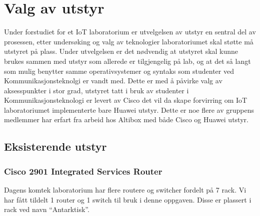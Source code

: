 \documentclass{article}
\begin{document}

\newpage
\section{Valg av utstyr}
Under forstudiet for et IoT laboratorium er utvelgelsen av utstyr en sentral del av prosessen, etter undersøking og valg av teknologier laboratoriumet skal støtte må utstyret på plass. Under utvelgelsen er det nødvendig at utstyret skal kunne brukes sammen med utstyr som allerede er tilgjengelig på lab, og at det så langt som mulig benytter samme operativsystemer og syntaks som studenter ved Kommunikasjonsteknolgi er vandt med. Dette er med å påvirke valg av aksesspunkter i stor grad, utstyret tatt i bruk av studenter i Kommunikasjonsteknologi er levert av Cisco det vil da skape forvirring om IoT laboratoriumet implementerte bare Huawei utstyr. Dette er noe flere av gruppens medlemmer har erfart fra arbeid hos Altibox med både Cisco og Huawei utstyr.

\subsection{Eksisterende utstyr}

\subsubsection{Cisco 2901 Integrated Services Router}
Dagens komtek laboratorium har flere routere og switcher fordelt på 7 rack. Vi har fått tildelt 1 router og 1 switch til bruk i denne oppgaven. Disse er plassert i rack ved navn “Antarktisk”. 
\end{document}
